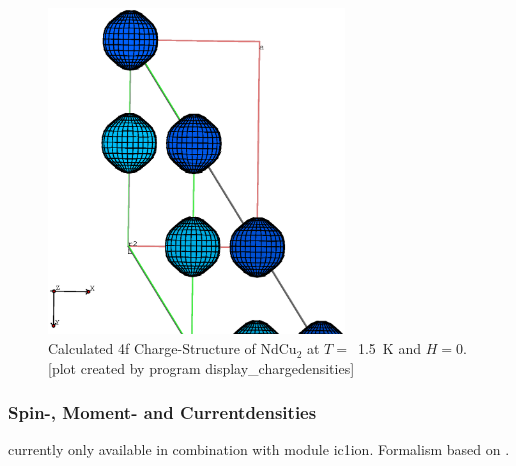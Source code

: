 \begin{figure}[hb]%
\begin{center}\leavevmode
\includegraphics[angle=0, width=0.7\textwidth]{figsrc/ndcu2b/resultss/chargesab.eps}
\end{center}
\caption{Calculated 4f Charge-Structure of NdCu$_2$ at $T=$~1.5~K and $H=0$.
[plot created by program {\prg display\_chargedensities}]}
\label{chargegraphic}
\end{figure}

\subsubsection{Spin-, Moment- and Currentdensities}

currently only available in combination with module {\prg ic1ion}.
Formalism based on \cite{balcar75-1581,balcar89-1,rotter11-12005}.

